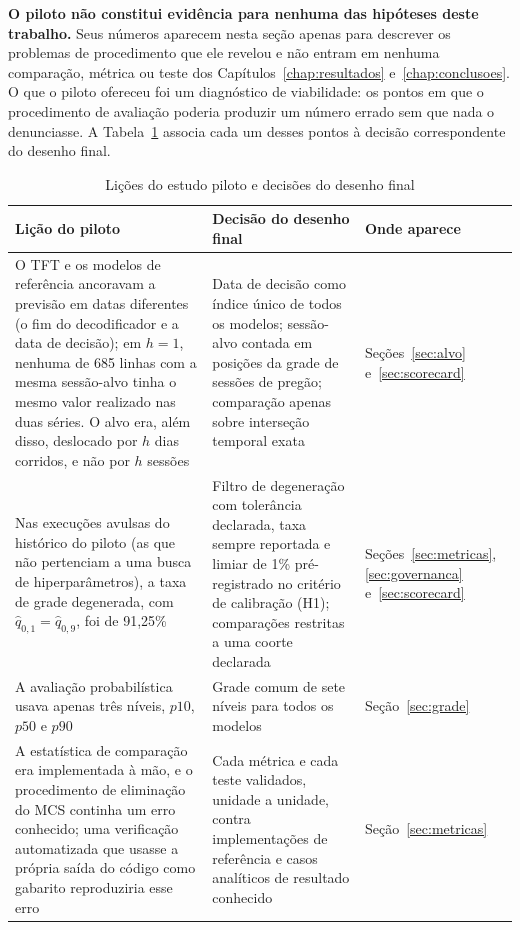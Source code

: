 \textbf{O piloto não constitui evidência para nenhuma das hipóteses deste trabalho.} Seus números aparecem nesta seção apenas para descrever os problemas de procedimento que ele revelou e não entram em nenhuma comparação, métrica ou teste dos Capítulos~\ref{chap:resultados} e~\ref{chap:conclusoes}. O que o piloto ofereceu foi um diagnóstico de viabilidade: os pontos em que o procedimento de avaliação poderia produzir um número errado sem que nada o denunciasse. A Tabela~\ref{tab:piloto} associa cada um desses pontos à decisão correspondente do desenho final.

\begin{table}[htb]
\centering
\caption{Lições do estudo piloto e decisões do desenho final}
\label{tab:piloto}
\small
\begin{tabular}{>{\raggedright\arraybackslash}p{5.4cm} >{\raggedright\arraybackslash}p{6.4cm} >{\raggedright\arraybackslash}p{2.6cm}}
\toprule
Lição do piloto & Decisão do desenho final & Onde aparece \\
\midrule
O TFT e os modelos de referência ancoravam a previsão em datas diferentes (o fim do decodificador e a data de decisão); em \(h = 1\), nenhuma de 685 linhas com a mesma sessão-alvo tinha o mesmo valor realizado nas duas séries. O alvo era, além disso, deslocado por \(h\) dias corridos, e não por \(h\) sessões & Data de decisão como índice único de todos os modelos; sessão-alvo contada em posições da grade de sessões de pregão; comparação apenas sobre interseção temporal exata & Seções~\ref{sec:alvo} e~\ref{sec:scorecard} \\
\addlinespace
Nas execuções avulsas do histórico do piloto (as que não pertenciam a uma busca de hiperparâmetros), a taxa de grade degenerada, com \(\hat{q}_{0{,}1} = \hat{q}_{0{,}9}\), foi de 91,25\% & Filtro de degeneração com tolerância declarada, taxa sempre reportada e limiar de 1\% pré-registrado no critério de calibração (H1); comparações restritas a uma coorte declarada & Seções~\ref{sec:metricas}, \ref{sec:governanca} e~\ref{sec:scorecard} \\
\addlinespace
A avaliação probabilística usava apenas três níveis, \(p10\), \(p50\) e \(p90\) & Grade comum de sete níveis para todos os modelos & Seção~\ref{sec:grade} \\
\addlinespace
A estatística de comparação era implementada à mão, e o procedimento de eliminação do MCS continha um erro conhecido; uma verificação automatizada que usasse a própria saída do código como gabarito reproduziria esse erro & Cada métrica e cada teste validados, unidade a unidade, contra implementações de referência e casos analíticos de resultado conhecido & Seção~\ref{sec:metricas} \\

\end{tabular}
\end{table}
